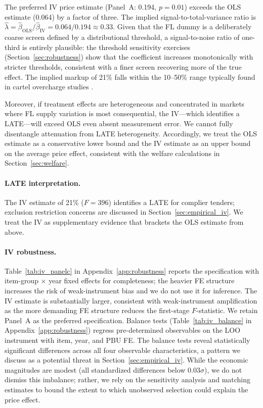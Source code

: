 



The preferred IV price estimate (Panel~A: 0.194, $p = 0.01$) exceeds
the OLS estimate (0.064) by a factor of three. The implied
signal-to-total-variance ratio is
$\hat{\lambda} = \hat{\beta}_{\text{OLS}} / \hat{\beta}_{\text{IV}}
= 0.064 / 0.194 \approx 0.33$.
Given that the FL dummy is a deliberately coarse screen defined by a
distributional threshold, a signal-to-noise ratio of one-third is
entirely plausible: the threshold sensitivity exercises
(Section~\ref{sec:robustness}) show that the coefficient increases
monotonically with stricter thresholds, consistent with a finer screen
recovering more of the true effect. The implied markup of 21\% falls
within the 10--50\% range typically found in cartel overcharge studies
\citep{connor2007price}.

Moreover, if treatment effects are heterogeneous and concentrated in
markets where FL supply variation is most consequential, the
IV---which identifies a LATE---will exceed OLS even absent measurement
error. We cannot fully disentangle attenuation from LATE heterogeneity.
Accordingly, we treat the OLS estimate as a conservative lower bound and
the IV estimate as an upper bound on the average price effect, consistent
with the welfare calculations in Section~\ref{sec:welfare}.

\paragraph{LATE interpretation.} %
The IV estimate of 21\% ($F = 396$) identifies a LATE for complier
tenders; exclusion restriction concerns are discussed in
Section~\ref{sec:empirical_iv}. We treat the IV as supplementary
evidence that brackets the OLS estimate from above.

\paragraph{IV robustness.}
Table~\ref{tab:iv_panelc} in Appendix~\ref{app:robustness} reports the
specification with item-group $\times$ year fixed effects for
completeness; the heavier FE structure increases the risk of
weak-instrument bias and we do not use it for inference. The IV estimate
is substantially larger, consistent with weak-instrument amplification as
the more demanding FE structure reduces the first-stage $F$-statistic.
We retain Panel~A as the preferred specification. Balance tests (Table~\ref{tab:iv_balance}
in Appendix~\ref{app:robustness}) regress pre-determined observables on
the LOO instrument with item, year, and PBU FE. The balance tests %
reveal statistically significant differences across all four
observable characteristics, a pattern we discuss as a potential threat
in Section~\ref{sec:empirical_iv}. While the economic magnitudes are
modest (all standardized differences below 0.03$\sigma$), we do not
dismiss this imbalance; rather, we rely on the sensitivity analysis
and matching estimates to bound the extent to which unobserved
selection could explain the price effect.

